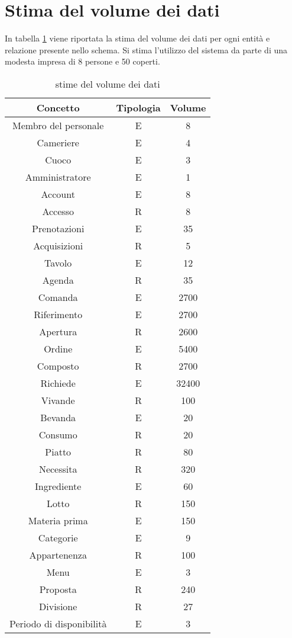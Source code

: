 \documentclass[a4paper,12pt]{report}
\begin{document}
\section{Stima del volume dei dati}
In tabella \ref{table:stima-dati} viene riportata la stima del volume dei dati per ogni entità e relazione presente nello schema. Si stima l'utilizzo del sistema da parte di una modesta impresa di 8 persone e 50 coperti.
\begin{table}[H]
\centering
\begin{tabular}{||c | c | c||} 
 \hline
 Concetto & Tipologia & Volume\\
 \hline\hline
Membro del personale & E & 8\\
\hline
Cameriere &  E& 4\\
\hline
Cuoco & E& 3\\
\hline
Amministratore & E& 1\\
\hline
Account & E& 8\\
\hline
Accesso & R& 8\\
\hline
Prenotazioni & E & 35\\
\hline
Acquisizioni & R & 5\\
\hline
Tavolo & E & 12\\
\hline
Agenda & R & 35\\
\hline
Comanda & E& 2700\\
\hline
Riferimento & E & 2700\\
\hline
Apertura & R& 2600\\
\hline
Ordine & E& 5400\\
\hline
Composto & R& 2700\\
\hline
Richiede & E& 32400\\
\hline
Vivande & R& 100\\
\hline
Bevanda & E& 20\\
\hline
Consumo & R & 20\\
\hline
Piatto & R & 80\\
\hline
Necessita & R & 320\\
\hline
Ingrediente & E & 60\\
\hline
Lotto & R & 150\\
\hline
Materia prima & E & 150\\
\hline
Categorie & E & 9\\
\hline
Appartenenza & R & 100\\
\hline
Menu & E & 3\\
\hline
Proposta & R & 240\\
\hline
Divisione & R & 27\\
\hline
Periodo di disponibilità & E & 3\\
\hline
\end{tabular}
\caption{stime del volume dei dati}
\label{table:stima-dati}
\end{table}
\end{document}

